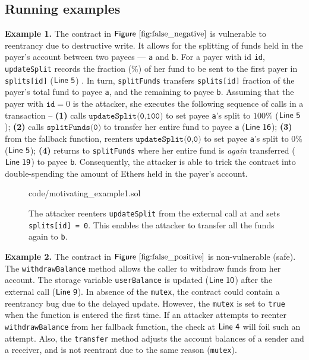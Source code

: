 \documentclass[conference, romanappendices]{tex/IEEEtran}
\theoremstyle{bfnote}
\newcommand{\reentrancy}{{reentrancy}\xspace}
\newcommand{\Line}[1]{\ensuremath{\sf Line~ #1}}
\newcommand{\Fig}[1]{\ensuremath{\sf Figure~\ref{#1}}}
\begin{document}
\subsection{\textbf{Running examples}}
\noindent
\textbf{Example 1.}
The contract in \Fig{fig:false_negative} is vulnerable to \reentrancy due to {destructive\EndAccSupp{}} write.
It allows for the splitting of funds held in the payer's account between two payees --- \texttt{a} and \texttt{b}.
For a payer with id \texttt{id}, \texttt{updateSplit} records the fraction ($\%$) of her fund to be sent to the first payer in \texttt{splits[id]} (\Line{5}) .
In turn, \texttt{splitFunds} transfers \texttt{splits[id]} fraction of the payer's total fund to payee \texttt{a}, and the remaining to payee \texttt{b}.
Assuming that the payer with $\texttt{id}=0$ is the attacker, she executes the following sequence of calls in a transaction --
\textbf{(1)} calls $\texttt{updateSplit(0,100)}$ to set payee \texttt{a}'s split to $100\%$ (\Line{5});
\textbf{(2)} calls $\texttt{splitFunds(0)}$ to transfer her entire fund to payee \texttt{a} (\Line{16});
\textbf{(3)} from the fallback function, reenters $\texttt{updateSplit(0,0)}$ to set payee \texttt{a}'s split to $0\%$ (\Line{5});
\textbf{(4)} returns to \texttt{splitFunds} where her entire fund is \textit{again} transferred (\Line{19}) to payee \texttt{b}.
Consequently, the attacker is able to trick the contract into double-spending the amount of {Ethers\EndAccSupp{}} held in the payer's account.
\begin{figure}[t]
		
		{code/motivating_example1.sol}
	\vspace{-0.15in}
	\caption{\small The attacker reenters \texttt{updateSplit} from the external call at  and sets \texttt{splits[id] = 0}.
		This enables the attacker to transfer all the funds again to \texttt{b}.}
	\label{fig:false_negative}
	\vspace{-7mm}
\end{figure}


\noindent
\textbf{Example 2.}
The contract in \Fig{fig:false_positive} is non-vulnerable (safe).
The \texttt{withdrawBalance} method allows the caller to {withdraw\EndAccSupp{}} funds from her account.
The storage variable \texttt{userBalance} is updated (\Line{10}) after the external call (\Line{9}).
In absence of the \texttt{mutex}, the contract could contain a \reentrancy bug due to the delayed update. 
However, the \texttt{mutex} is set to \texttt{true} when the function is entered the first time.
If an attacker attempts to reenter \texttt{withdrawBalance} from her fallback function, the check at \Line{4} will foil such an attempt.
Also, the \texttt{transfer} method adjusts the account balances of a {sender\EndAccSupp{}} and a receiver, and is not reentrant due to the same reason (\texttt{mutex}).
\end{document}

